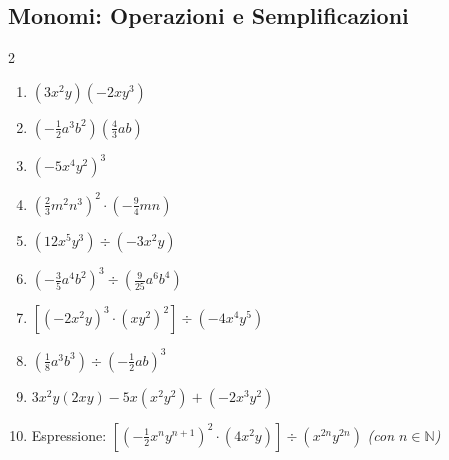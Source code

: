 \subsection{Monomi: Operazioni e Semplificazioni}
\begin{multicols}{2}
\begin{enumerate}
    \item {} $(3x^2y)(-2xy^3)$
    \item {} $\left(-\frac{1}{2}a^3b^2\right)\left(\frac{4}{3}ab\right)$
    \item {} $(-5x^4y^2)^3$
    \item {} $\left(\frac{2}{3}m^2n^3\right)^2 \cdot \left(-\frac{9}{4}mn\right)$
    \item {} $(12x^5y^3) \div (-3x^2y)$
    \item {} $\left(-\frac{3}{5}a^4b^2\right)^3 \div \left(\frac{9}{25}a^6b^4\right)$
    \item {} $[(-2x^2y)^3 \cdot (xy^2)^2] \div (-4x^4y^5)$
    \item {} $\left(\frac{1}{8}a^3b^3\right) \div \left(-\frac{1}{2}ab\right)^3$
    \item {} $3x^2y(2xy) - 5x(x^2y^2) + (-2x^3y^2)$
    \item {} Espressione: $\left[ \left(-\frac{1}{2}x^n y^{n+1}\right)^2 \cdot (4x^2y) \right] \div (x^{2n}y^{2n})$ \textit{(con $n \in \mathbb{N}$)}
\end{enumerate}
\end{multicols}

